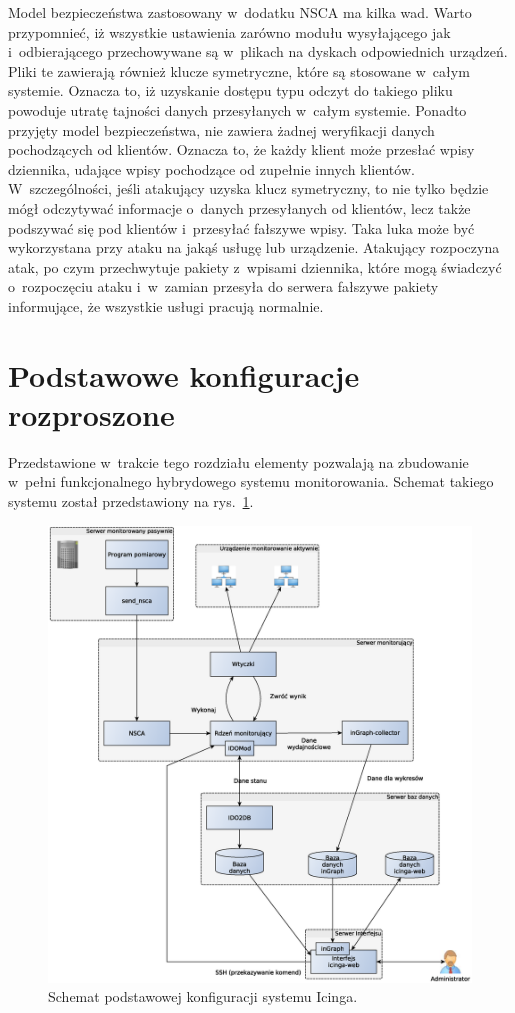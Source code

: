 Model bezpieczeństwa zastosowany w~dodatku NSCA ma kilka wad. Warto
przypomnieć, iż wszystkie ustawienia zarówno modułu wysyłającego jak
i~odbierającego przechowywane są w~plikach na dyskach odpowiednich
urządzeń. Pliki te zawierają również klucze symetryczne, które są
stosowane w~całym systemie. Oznacza to, iż uzyskanie dostępu typu
odczyt do takiego pliku powoduje utratę tajności danych przesyłanych
w~całym systemie. Ponadto przyjęty model bezpieczeństwa, nie zawiera
żadnej weryfikacji danych pochodzących od klientów. Oznacza to, że
każdy klient może przesłać wpisy dziennika, udające wpisy pochodzące
od zupełnie innych klientów. W~szczególności, jeśli atakujący uzyska
klucz symetryczny, to nie tylko będzie mógł odczytywać informacje
o~danych przesyłanych od klientów, lecz także podszywać się pod
klientów i~przesyłać fałszywe wpisy. Taka luka może być wykorzystana
przy ataku na jakąś usługę lub urządzenie. Atakujący rozpoczyna atak,
po czym przechwytuje pakiety z~wpisami dziennika, które mogą świadczyć
o~rozpoczęciu ataku i~w~zamian przesyła do serwera fałszywe pakiety
informujące, że wszystkie usługi pracują normalnie.

\section[Konfiguracje rozproszone][Podstawowe konfiguracje rozproszone]{Podstawowe konfiguracje rozproszone}

Przedstawione w~trakcie tego rozdziału elementy pozwalają na
zbudowanie w~pełni funkcjonalnego hybrydowego systemu
monitorowania. Schemat takiego systemu został przedstawiony na
rys.~\ref{fig:icingaBase}.

\begin{figure}[htpb]
  \caption{Schemat podstawowej konfiguracji systemu Icinga.}
  \label{fig:icingaBase}
\includegraphics[width=1\textwidth]{img/icingaBase}
\end{figure}

